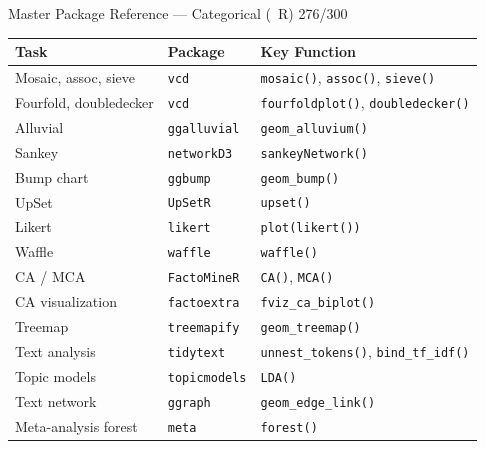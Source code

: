 \documentclass[10pt]{beamer}
\newcommand{\Rlang}{\textcolor{RAccent}{\faRProject~R}}
\newcommand{\smark}[1]{\hfill{\scriptsize\color{codegray}#1}}
\begin{document}
\begin{frame}{Master Package Reference --- Categorical (\Rlang)}
\smark{276/300}
\centering\scriptsize
\begin{tabular}{@{}lll@{}}
    \toprule
    \textbf{Task} & \textbf{Package} & \textbf{Key Function} \\
    \midrule
    Mosaic, assoc, sieve     & \texttt{vcd}            & \texttt{mosaic()}, \texttt{assoc()}, \texttt{sieve()} \\
    Fourfold, doubledecker   & \texttt{vcd}            & \texttt{fourfoldplot()}, \texttt{doubledecker()} \\
    Alluvial                 & \texttt{ggalluvial}     & \texttt{geom\_alluvium()} \\
    Sankey                   & \texttt{networkD3}      & \texttt{sankeyNetwork()} \\
    Bump chart               & \texttt{ggbump}         & \texttt{geom\_bump()} \\
    UpSet                    & \texttt{UpSetR}         & \texttt{upset()} \\
    Likert                   & \texttt{likert}         & \texttt{plot(likert())} \\
    Waffle                   & \texttt{waffle}         & \texttt{waffle()} \\
    CA / MCA                 & \texttt{FactoMineR}     & \texttt{CA()}, \texttt{MCA()} \\
    CA visualization         & \texttt{factoextra}     & \texttt{fviz\_ca\_biplot()} \\
    Treemap                  & \texttt{treemapify}     & \texttt{geom\_treemap()} \\
    Text analysis            & \texttt{tidytext}       & \texttt{unnest\_tokens()}, \texttt{bind\_tf\_idf()} \\
    Topic models             & \texttt{topicmodels}    & \texttt{LDA()} \\
    Text network             & \texttt{ggraph}         & \texttt{geom\_edge\_link()} \\
    Meta-analysis forest     & \texttt{meta}           & \texttt{forest()} \\
    \bottomrule
\end{tabular}
\end{frame}
\end{document}
